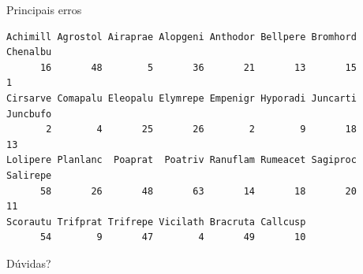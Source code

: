 \documentclass[
  ignorenonframetext,
]{beamer}
\begin{document}
\begin{frame}[fragile]{}
\begin{block}{Principais erros}
\begin{verbatim}
Achimill Agrostol Airaprae Alopgeni Anthodor Bellpere Bromhord Chenalbu 
      16       48        5       36       21       13       15        1 
Cirsarve Comapalu Eleopalu Elymrepe Empenigr Hyporadi Juncarti Juncbufo 
       2        4       25       26        2        9       18       13 
Lolipere Planlanc  Poaprat  Poatriv Ranuflam Rumeacet Sagiproc Salirepe 
      58       26       48       63       14       18       20       11 
Scorautu Trifprat Trifrepe Vicilath Bracruta Callcusp 
      54        9       47        4       49       10 
\end{verbatim}
\end{block}
\end{frame}

\begin{frame}{Dúvidas?}
\protect\hypertarget{duxfavidas}{}
\end{frame}
\end{document}
